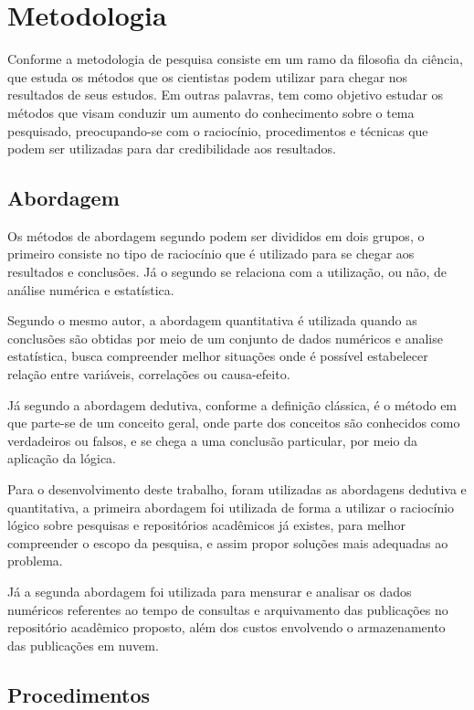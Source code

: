 \section{Metodologia} \label{sec:Methodology}

Conforme \citep[p. 15]{LOVATO:metodologia} a metodologia de pesquisa
consiste em um ramo da filosofia da ciência, que estuda os métodos que
os cientistas podem utilizar para chegar nos resultados de seus estudos.
Em outras palavras, tem como objetivo estudar os métodos que visam
conduzir um aumento do conhecimento sobre o tema pesquisado, preocupando-se
com o raciocínio, procedimentos e técnicas que podem ser utilizadas para
dar credibilidade aos resultados.

\subsection{Abordagem}

Os métodos de abordagem segundo \citep[p. 29]{LOVATO:metodologia} podem ser
divididos em dois grupos, o primeiro consiste no tipo de raciocínio que
é utilizado para se chegar aos resultados e conclusões. Já o segundo
se relaciona com a utilização, ou não, de análise numérica e estatística.

Segundo o mesmo autor, a abordagem quantitativa é utilizada quando
as conclusões são obtidas por meio de um conjunto de dados numéricos
e analise estatística, busca compreender melhor situações onde é possível
estabelecer relação entre variáveis, correlações ou causa-efeito.

Já segundo \cite{GIL:metodologia} a abordagem dedutiva, conforme a definição clássica,
é o método em que parte-se de um conceito geral, onde parte dos
conceitos são conhecidos como verdadeiros ou falsos, e se chega
a uma conclusão particular, por meio da aplicação da lógica.

Para o desenvolvimento deste trabalho, foram utilizadas as abordagens
dedutiva e quantitativa, a primeira abordagem foi utilizada
de forma a utilizar o raciocínio lógico sobre pesquisas e repositórios
acadêmicos já existes, para melhor compreender o escopo da pesquisa,
e assim propor soluções mais adequadas ao problema.

Já a segunda abordagem foi utilizada para mensurar e analisar
os dados numéricos referentes ao tempo de consultas e arquivamento
das publicações no repositório acadêmico proposto, além dos
custos envolvendo o armazenamento das publicações em nuvem.

\subsection{Procedimentos}

